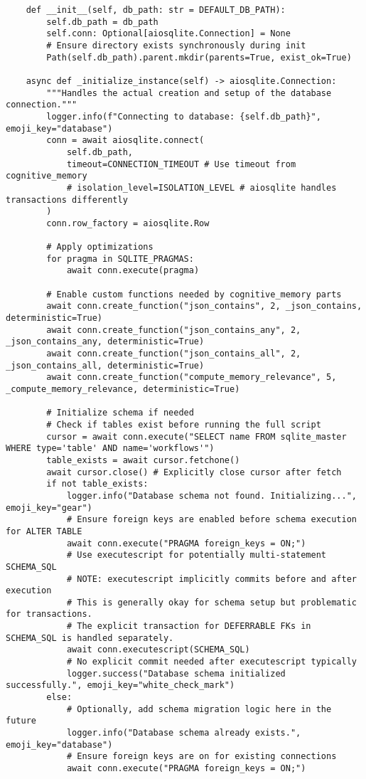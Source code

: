 \documentclass[12pt,a4paper]{article}
\begin{document}
\begin{pageablecode}
\begin{verbatim}
    def __init__(self, db_path: str = DEFAULT_DB_PATH):
        self.db_path = db_path
        self.conn: Optional[aiosqlite.Connection] = None
        # Ensure directory exists synchronously during init
        Path(self.db_path).parent.mkdir(parents=True, exist_ok=True)

    async def _initialize_instance(self) -> aiosqlite.Connection:
        """Handles the actual creation and setup of the database connection."""
        logger.info(f"Connecting to database: {self.db_path}", emoji_key="database")
        conn = await aiosqlite.connect(
            self.db_path,
            timeout=CONNECTION_TIMEOUT # Use timeout from cognitive_memory
            # isolation_level=ISOLATION_LEVEL # aiosqlite handles transactions differently
        )
        conn.row_factory = aiosqlite.Row

        # Apply optimizations
        for pragma in SQLITE_PRAGMAS:
            await conn.execute(pragma)

        # Enable custom functions needed by cognitive_memory parts
        await conn.create_function("json_contains", 2, _json_contains, deterministic=True)
        await conn.create_function("json_contains_any", 2, _json_contains_any, deterministic=True)
        await conn.create_function("json_contains_all", 2, _json_contains_all, deterministic=True)
        await conn.create_function("compute_memory_relevance", 5, _compute_memory_relevance, deterministic=True)

        # Initialize schema if needed
        # Check if tables exist before running the full script
        cursor = await conn.execute("SELECT name FROM sqlite_master WHERE type='table' AND name='workflows'")
        table_exists = await cursor.fetchone()
        await cursor.close() # Explicitly close cursor after fetch
        if not table_exists:
            logger.info("Database schema not found. Initializing...", emoji_key="gear")
            # Ensure foreign keys are enabled before schema execution for ALTER TABLE
            await conn.execute("PRAGMA foreign_keys = ON;")
            # Use executescript for potentially multi-statement SCHEMA_SQL
            # NOTE: executescript implicitly commits before and after execution
            # This is generally okay for schema setup but problematic for transactions.
            # The explicit transaction for DEFERRABLE FKs in SCHEMA_SQL is handled separately.
            await conn.executescript(SCHEMA_SQL)
            # No explicit commit needed after executescript typically
            logger.success("Database schema initialized successfully.", emoji_key="white_check_mark")
        else:
            # Optionally, add schema migration logic here in the future
            logger.info("Database schema already exists.", emoji_key="database")
            # Ensure foreign keys are on for existing connections
            await conn.execute("PRAGMA foreign_keys = ON;")


\end{verbatim}
\end{pageablecode}
\end{document}
